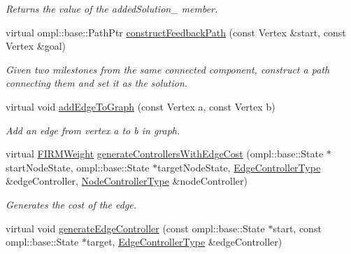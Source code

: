 \begin{DoxyCompactItemize}
\begin{DoxyCompactList}\small\item\em \-Returns the value of the added\-Solution\-\_\- member. \end{DoxyCompactList}\item 
virtual ompl\-::base\-::\-Path\-Ptr \hyperlink{class_f_i_r_m_a6a5bc8f73d3440780f68ba2ed2fae8c3}{construct\-Feedback\-Path} (const \-Vertex \&start, const \-Vertex \&goal)
\begin{DoxyCompactList}\small\item\em \-Given two milestones from the same connected component, construct a path connecting them and set it as the solution. \end{DoxyCompactList}\item 
\hypertarget{class_f_i_r_m_af72f67131d7d663468bca975acf6530f}{virtual void \hyperlink{class_f_i_r_m_af72f67131d7d663468bca975acf6530f}{add\-Edge\-To\-Graph} (const \-Vertex a, const \-Vertex b)}\label{class_f_i_r_m_af72f67131d7d663468bca975acf6530f}

\begin{DoxyCompactList}\small\item\em \-Add an edge from vertex a to b in graph. \end{DoxyCompactList}\item 
\hypertarget{class_f_i_r_m_acb96d1cd6665cf4da65a41f580932103}{virtual \hyperlink{class_f_i_r_m_weight}{\-F\-I\-R\-M\-Weight} \hyperlink{class_f_i_r_m_acb96d1cd6665cf4da65a41f580932103}{generate\-Controllers\-With\-Edge\-Cost} (ompl\-::base\-::\-State $\ast$start\-Node\-State, ompl\-::base\-::\-State $\ast$target\-Node\-State, \hyperlink{class_f_i_r_m_a70abcb24fbc9f836b94119f65c8f8a37}{\-Edge\-Controller\-Type} \&edge\-Controller, \hyperlink{class_controller}{\-Node\-Controller\-Type} \&node\-Controller)}\label{class_f_i_r_m_acb96d1cd6665cf4da65a41f580932103}

\begin{DoxyCompactList}\small\item\em \-Generates the cost of the edge. \end{DoxyCompactList}\item 
\hypertarget{class_f_i_r_m_a776783fea0cacfa2d00f7b8876fe1679}{virtual void \hyperlink{class_f_i_r_m_a776783fea0cacfa2d00f7b8876fe1679}{generate\-Edge\-Controller} (const ompl\-::base\-::\-State $\ast$start, const ompl\-::base\-::\-State $\ast$target, \hyperlink{class_f_i_r_m_a70abcb24fbc9f836b94119f65c8f8a37}{\-Edge\-Controller\-Type} \&edge\-Controller)}\label{class_f_i_r_m_a776783fea0cacfa2d00f7b8876fe1679}


\end{DoxyCompactItemize}
